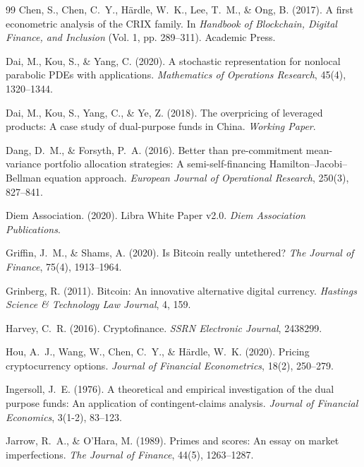 \documentclass[11pt,a4paper]{article}
\begin{document}
\begin{thebibliography}{99}
Chen, S., Chen, C.~Y., H{\"a}rdle, W.~K., Lee, T.~M., \& Ong, B. (2017).
\newblock A first econometric analysis of the CRIX family.
\newblock In \textit{Handbook of Blockchain, Digital Finance, and Inclusion} (Vol. 1, pp. 289--311). Academic Press.

Dai, M., Kou, S., \& Yang, C. (2020).
\newblock A stochastic representation for nonlocal parabolic PDEs with applications.
\newblock \textit{Mathematics of Operations Research}, 45(4), 1320--1344.

Dai, M., Kou, S., Yang, C., \& Ye, Z. (2018).
\newblock The overpricing of leveraged products: A case study of dual-purpose funds in China.
\newblock \textit{Working Paper}.

Dang, D.~M., \& Forsyth, P.~A. (2016).
\newblock Better than pre-commitment mean-variance portfolio allocation strategies: A semi-self-financing Hamilton--Jacobi--Bellman equation approach.
\newblock \textit{European Journal of Operational Research}, 250(3), 827--841.

Diem Association. (2020).
\newblock Libra White Paper v2.0.
\newblock \textit{Diem Association Publications}.

Griffin, J.~M., \& Shams, A. (2020).
\newblock Is Bitcoin really untethered?
\newblock \textit{The Journal of Finance}, 75(4), 1913--1964.

Grinberg, R. (2011).
\newblock Bitcoin: An innovative alternative digital currency.
\newblock \textit{Hastings Science \& Technology Law Journal}, 4, 159.

Harvey, C.~R. (2016).
\newblock Cryptofinance.
\newblock \textit{SSRN Electronic Journal}, 2438299.

Hou, A.~J., Wang, W., Chen, C.~Y., \& H{\"a}rdle, W.~K. (2020).
\newblock Pricing cryptocurrency options.
\newblock \textit{Journal of Financial Econometrics}, 18(2), 250--279.

Ingersoll, J.~E. (1976).
\newblock A theoretical and empirical investigation of the dual purpose funds: An application of contingent-claims analysis.
\newblock \textit{Journal of Financial Economics}, 3(1-2), 83--123.

Jarrow, R.~A., \& O'Hara, M. (1989).
\newblock Primes and scores: An essay on market imperfections.
\newblock \textit{The Journal of Finance}, 44(5), 1263--1287.


\end{thebibliography}
\end{document}
